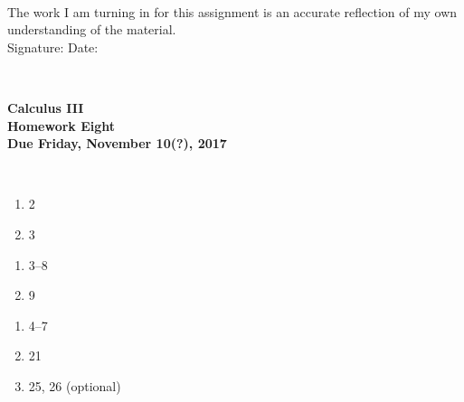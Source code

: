 \documentclass[12pt]{article}
\begin{document}
\\

\bigskip
\bigskip
\bigskip
\bigskip
\bigskip
\bigskip
\noindent The work I am turning in for this assignment is an accurate
reflection of my own understanding of the material.\\[14pt]

\noindent Signature: \underline{\hspace{7cm}} \hspace{1cm} Date:
\underline{\hspace{5cm}} 


\hspace{2mm}\\
\newpage



 
\begin{center}
{\large {\bf Calculus III}}\\
\medskip
{\large {\bf Homework Eight}}\\
\medskip
{ {\bf Due Friday, November 10(?), 2017}}\\
\end{center}

\hspace{2mm}\\

\begin{enumerate}
\setlength{\itemsep}{-1mm}
  \item  2
  \item 3

\end{enumerate}


\begin{enumerate}
\setlength{\itemsep}{-1mm}
  \item 3--8
  \item 9
\end{enumerate}


\begin{enumerate}
\setlength{\itemsep}{-1mm}
  \item 4--7
  \item 21
  \item 25, 26 (optional)
\end{enumerate}
\end{document}
